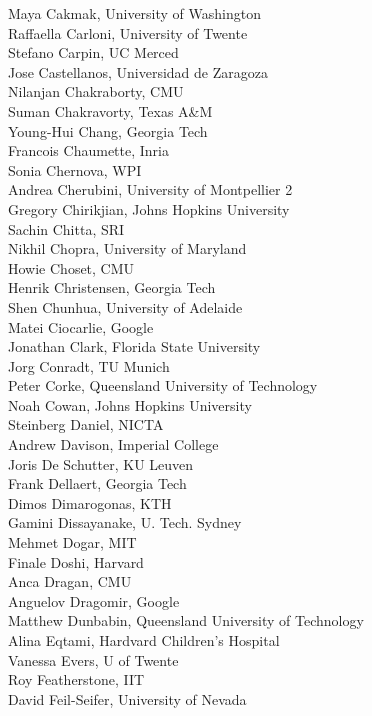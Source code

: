 \begin{multicols}{3}
{Maya Cakmak, University of Washington\\
Raffaella Carloni, University of Twente\\
Stefano Carpin, UC Merced\\
Jose Castellanos, Universidad de Zaragoza\\
Nilanjan Chakraborty, CMU\\
Suman Chakravorty, Texas A\&M\\
Young-Hui Chang, Georgia Tech\\
Francois Chaumette, Inria\\
Sonia Chernova, WPI\\
Andrea Cherubini, University of Montpellier 2\\
Gregory Chirikjian, Johns Hopkins University\\
Sachin Chitta, SRI\\
Nikhil Chopra, University of Maryland\\
Howie Choset, CMU\\
Henrik Christensen, Georgia Tech\\
Shen Chunhua, University of Adelaide\\
Matei Ciocarlie, Google\\
Jonathan Clark, Florida State University\\
Jorg Conradt, TU Munich\\
Peter Corke, Queensland University of Technology\\
Noah Cowan, Johns Hopkins University\\
Steinberg Daniel, NICTA\\
Andrew Davison, Imperial College\\
Joris De Schutter, KU Leuven\\
Frank Dellaert, Georgia Tech\\
Dimos Dimarogonas, KTH\\
Gamini Dissayanake, U. Tech. Sydney\\
Mehmet Dogar, MIT\\
Finale Doshi, Harvard\\
Anca Dragan, CMU\\
Anguelov Dragomir, Google\\
Matthew Dunbabin, Queensland University of Technology\\
Alina Eqtami, Hardvard Children's Hospital\\
Vanessa Evers, U of Twente\\
Roy Featherstone, IIT\\
David Feil-Seifer, University of Nevada\\
}
\end{multicols}
